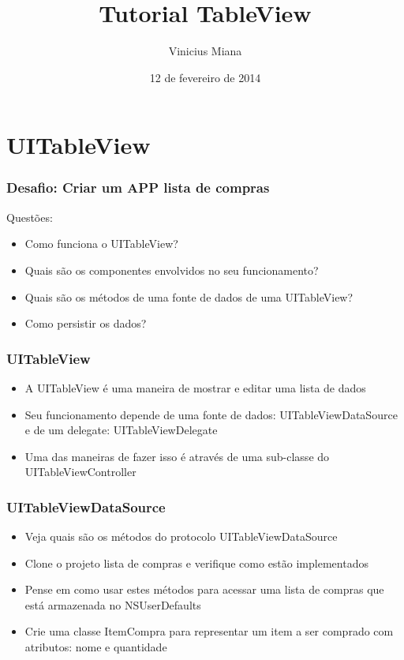 \documentclass[serif,mathserif]{beamer}
\author[Vinicius Miana]{Vinicius Miana}
\title[Short Title\hspace{2em}\insertframenumber/\inserttotalframenumber]{Tutorial TableView}
\date{12 de fevereiro de 2014} %
\institute{Universidade Presbiteriana Mackenzie}
\begin{document}

\maketitle

\section{UITableView}  


\begin{frame}
  \frametitle{Desafio: Criar um APP lista de compras}
   Questões:
  \begin{itemize}
  \item Como funciona o UITableView? 
  \item Quais são os componentes envolvidos no seu funcionamento?
  \item Quais são os métodos de uma fonte de dados de uma UITableView?
  \item Como persistir os dados?
  \end{itemize}
\end{frame}


\begin{frame}
  \frametitle{UITableView}
  \begin{itemize}
  \item A UITableView é uma maneira de mostrar e editar uma lista de dados
  \item Seu funcionamento depende de uma fonte de dados: UITableViewDataSource e de um delegate: UITableViewDelegate
  \item Uma das maneiras de fazer isso é através de uma sub-classe do UITableViewController  
  \end{itemize}
\end{frame}



\begin{frame}
  \frametitle{UITableViewDataSource}
  \begin{itemize}
  \item Veja quais são os métodos do protocolo UITableViewDataSource
  \item Clone o projeto lista de compras e verifique como estão implementados
  \item Pense em como usar estes métodos para acessar uma lista de compras que está armazenada no NSUserDefaults
  \item Crie uma classe ItemCompra para representar um item a ser comprado com atributos: nome e quantidade  
  \end{itemize}
\end{frame}
\end{document}
